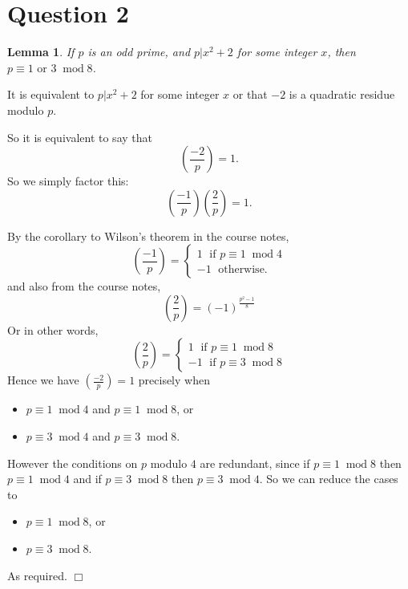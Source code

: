 \documentclass[10pt]{article}
\newtheorem{lemma}[theorem]{Lemma}
\newenvironment{proof}[1][Proof]{\begin{trivlist}
\item[\hskip \labelsep {\bfseries #1}]}{\end{trivlist}}
\newcommand{\modulo}[1]{\;\operatorname{mod} #1}
\newcommand{\legendre}[2]{\left(\frac{#1}{#2}\right)}
\begin{document}
\section*{Question 2}
\begin{lemma}
    If $p$ is an odd prime, and $p|x^2+2$ for some integer $x$, then $p \equiv 1\text{ or }3\modulo{8}$.
\end{lemma}
\begin{proof}
    It is equivalent to $p|x^2+2$ for some integer $x$
    or that $-2$ is a quadratic residue modulo $p$.
    
    So it is equivalent to say that
    \begin{equation*}
        \legendre{-2}{p} = 1.
    \end{equation*}
    So we simply factor this:
    \begin{equation*}
        \legendre{-1}{p}\legendre{2}{p} = 1.
    \end{equation*}
    
    By the corollary to Wilson's theorem
    in the course notes,
    \begin{equation*}
        \legendre{-1}{p} = \begin{cases}
            1\;\text{ if }p\equiv 1\modulo 4\\
            -1\;\text{ otherwise.}
        \end{cases}
    \end{equation*} 
    and also from the course notes,
    \begin{equation*}
        \legendre{2}{p} = (-1)^{\frac{p^2-1}{8}}
    \end{equation*}
    Or in other words,
    \begin{equation*}
        \legendre{2}{p} = \begin{cases}
            1\;\text{ if }p\equiv 1\modulo{8}\\
            -1\;\text{ if }p\equiv 3\modulo{8}        
        \end{cases}
    \end{equation*}
    Hence we have $\legendre{-2}{p} = 1$ precisely when
    \begin{itemize}
        \item{} $p\equiv 1\modulo{4}$ and $p\equiv 1\modulo{8}$, or
        \item{} $p\equiv 3\modulo{4}$ and $p\equiv 3\modulo{8}$.
    \end{itemize}
    However the conditions on $p$ modulo $4$ are redundant, since if $p\equiv 1\modulo{8}$
    then $p\equiv 1\modulo{4}$
    and if $p\equiv 3\modulo{8}$ then $p\equiv 3\modulo{4}$.
    So we can reduce the cases to
    \begin{itemize}
        \item{} $p\equiv 1\modulo{8}$, or
        \item{} $p\equiv 3\modulo{8}$.
    \end{itemize}
    As required. $\Box$
\end{proof}
\end{document}
